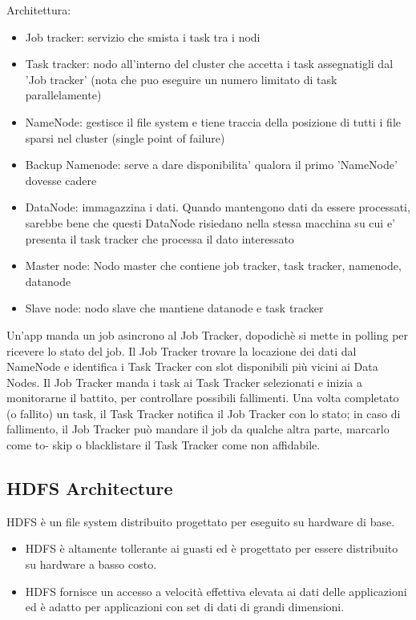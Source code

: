 \documentclass{article}
\begin{document}
Architettura:
\begin{itemize}
    \item Job tracker: servizio che smista i task tra i nodi
    \item Task tracker: nodo all'interno del cluster che accetta i task assegnatigli dal 'Job tracker' (nota che puo eseguire un numero limitato di task parallelamente)
    \item NameNode: gestisce il file system e tiene traccia della posizione di tutti i file sparsi nel cluster (single point of failure)
    \item Backup Namenode: serve a dare disponibilita' qualora il primo 'NameNode' dovesse cadere
    \item DataNode: immagazzina i dati. Quando mantengono dati da essere processati, sarebbe bene che questi DataNode risiedano nella stessa macchina su cui e' presenta il task tracker che processa il dato interessato
    \item Master node: Nodo master che contiene job tracker, task tracker, namenode, datanode
    \item Slave node: nodo slave che mantiene datanode e task tracker
\end{itemize}

Un’app manda un job asincrono al Job Tracker, dopodichè si mette in polling per ricevere lo stato del job. Il Job Tracker trovare la locazione dei dati dal NameNode e identifica i Task Tracker con slot disponibili più vicini ai Data Nodes.
Il Job Tracker manda i task ai Task Tracker selezionati e inizia a monitorarne il battito, per controllare possibili fallimenti. Una volta completato (o fallito) un task, il Task Tracker notifica il Job Tracker con lo stato; in caso di fallimento, il Job Tracker può mandare il job da qualche altra parte, marcarlo come to- skip o blacklistare il Task Tracker come non affidabile.

\subsection{HDFS Architecture}
HDFS è un file system distribuito progettato per
eseguito su hardware di base. 
\begin{itemize}
    \item HDFS è altamente tollerante ai guasti ed è progettato per essere distribuito su hardware a basso costo.
    \item HDFS fornisce un accesso a velocità effettiva elevata ai dati delle applicazioni ed è adatto per applicazioni con set di dati di grandi dimensioni.
\end{itemize}
\end{document}
